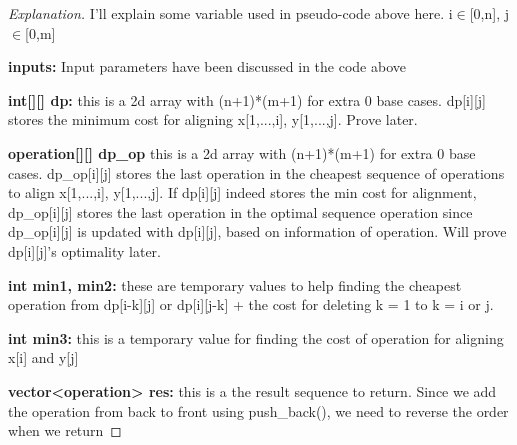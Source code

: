\documentclass[openany]{article}
\begin{document}
\begin{proof}[Explanation]{}
		\renewcommand{\qedsymbol}{} %
        I'll explain some variable used in pseudo-code above here. i$\in$[0,n], j$\in$[0,m]

        \textbf{inputs:} Input parameters have been discussed in the code above
        
        \textbf{int[][] dp:} this is a 2d array with (n+1)*(m+1) for extra 0 base cases. dp[i][j] stores the minimum cost for aligning x[1,...,i], y[1,...,j]. Prove later.
        
        \textbf{operation[][] dp\_op} this is a 2d array with (n+1)*(m+1) for extra 0 base cases. dp\_op[i][j] stores the last operation in the cheapest sequence of operations to align x[1,...,i], y[1,...,j]. If dp[i][j] indeed stores the min cost for alignment, dp\_op[i][j] stores the last operation in the optimal sequence operation since dp\_op[i][j] is updated with dp[i][j], based on information of operation. Will prove dp[i][j]'s optimality later.
        
        \textbf{int min1, min2:} these are temporary values to help finding the cheapest operation from dp[i-k][j] or dp[i][j-k] + the cost for deleting k = 1 to k = i or j.
        
        \textbf{int min3:} this is a temporary value for finding the cost of operation for aligning x[i] and y[j]
        
        \textbf{vector<operation> res:} this is a the result sequence to return. Since we add the operation from back to front using push\_back(), we need to reverse the order when we return
       
\end{proof}
\end{document}
